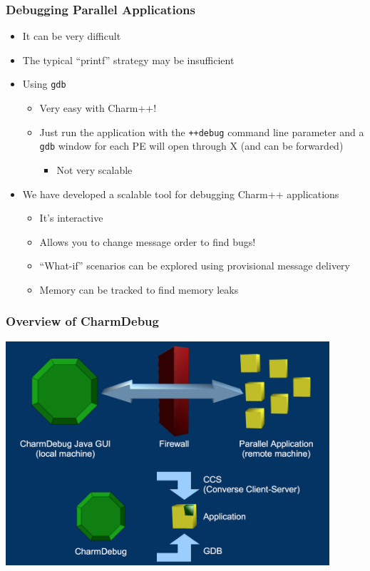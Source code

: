 \begin{frame}[fragile]
  \frametitle{Debugging Parallel Applications}
  \begin{itemize}
    \item It can be very difficult
    \item The typical ``printf'' strategy may be insufficient
    \item Using \texttt{gdb}
      \begin{itemize}
      \item Very easy with Charm++!
      \item Just run the application with the \texttt{++debug} command line
        parameter and a \texttt{gdb} window for each PE will open through X (and
        can be forwarded)
        \begin{itemize}
        \item Not very scalable
        \end{itemize}
      \end{itemize}
    \item We have developed a scalable tool for debugging Charm++ applications
      \begin{itemize}
      \item It's interactive
      \item Allows you to change message order to find bugs!
      \item ``What-if'' scenarios can be explored using provisional message
        delivery
      \item Memory can be tracked to find memory leaks
      \end{itemize}
  \end{itemize}
\end{frame}


\begin{frame}[fragile]
  \frametitle{Overview of CharmDebug}
  \begin{center}\includegraphics[width=0.9\textwidth]{figures/overviewDebug.png}\end{center}
\end{frame}


